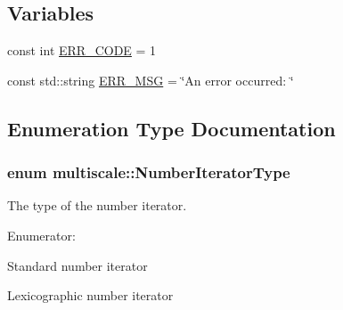 \subsection*{\-Variables}
\begin{DoxyCompactItemize}
\item 
const int \hyperlink{namespacemultiscale_a4ee40795105048ee371efeeb7962ecf6}{\-E\-R\-R\-\_\-\-C\-O\-D\-E} = 1
\item 
const std\-::string \hyperlink{namespacemultiscale_a06490e4e11ef359aa0260f96579ce584}{\-E\-R\-R\-\_\-\-M\-S\-G} = \char`\"{}\-An error occurred\-: \char`\"{}
\end{DoxyCompactItemize}


\subsection{\-Enumeration \-Type \-Documentation}
\hypertarget{namespacemultiscale_a6ef911f4d48a4bf5e657c237ec169ff5}{
\subsubsection[{\-Number\-Iterator\-Type}]{\setlength{\rightskip}{0pt plus 5cm}enum {\bf multiscale\-::\-Number\-Iterator\-Type}}}\label{namespacemultiscale_a6ef911f4d48a4bf5e657c237ec169ff5}


\-The type of the number iterator. 

\begin{Desc}
\item[\-Enumerator\-: ]\par
\begin{description}
\item[{\em 
\hypertarget{namespacemultiscale_a6ef911f4d48a4bf5e657c237ec169ff5aa048887eb0360a4b70dff5452133f42e}{\-S\-T\-A\-N\-D\-A\-R\-D}\label{namespacemultiscale_a6ef911f4d48a4bf5e657c237ec169ff5aa048887eb0360a4b70dff5452133f42e}
}]\-Standard number iterator \item[{\em 
\hypertarget{namespacemultiscale_a6ef911f4d48a4bf5e657c237ec169ff5a2cba3a0174cc5c1d555ee13dcf6cda15}{\-L\-E\-X\-I\-C\-O\-G\-R\-A\-P\-H\-I\-C}\label{namespacemultiscale_a6ef911f4d48a4bf5e657c237ec169ff5a2cba3a0174cc5c1d555ee13dcf6cda15}
}]\-Lexicographic number iterator \end{description}
\end{Desc}



